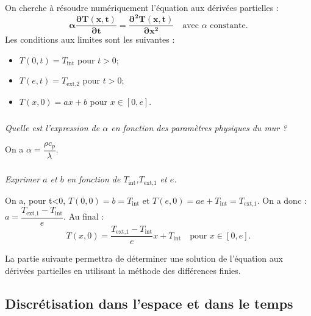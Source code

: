 \documentclass[10pt,fleqn]{article} %
\begin{document}
\ifprof
\else
On cherche à résoudre numériquement l'équation aux dérivées partielles : 
\begin{equation}
\mathbf{\alpha \dfrac{\partial T(x,t)}{\partial t} = \dfrac{\partial^2 T(x,t)}{\partial x^2}} \quad \text{avec }\alpha \text{ constante.}
\end{equation}
Les conditions aux limites sont les suivantes :
\begin{itemize}
\item $T(0,t)=T_{\text{int}}$ pour $t>0$;
\item $T(e,t)=T_{\text{ext,2}}$ pour $t>0$;
\item $T(x,0)=ax + b$ pour $x\in[0,e]$.
\end{itemize}
\fi

\subparagraph{}\textit{Quelle est l'expression de $\alpha$ en fonction des paramètres physiques du mur ?}
\ifprof
\begin{corrige}
On a $\alpha =\dfrac{\rho c_p}{\lambda}$.

\end{corrige}

\else
\fi

\subparagraph{\label{q_tini}}\textit{Exprimer $a$ et $b$ en fonction de $T_{\text{int}}$,$T_{\text{ext,1}}$ et $e$.}
\ifprof
\begin{corrige}
On a, pour t<0, $T(0,0)= b = T_{\text{int}}$ et  $T(e,0)= ae+ T_{\text{int}}= T_{\text{ext,1}}$. On a donc : $a= \dfrac{T_{\text{ext,1}}- T_{\text{int}}}{e}$. Au final :
$$T(x,0)=\dfrac{T_{\text{ext,1}}- T_{\text{int}}}{e} x + T_{\text{int}} \quad \text{pour } x\in[0,e].$$
\end{corrige}
\else
\fi
\ifprof
\else
\vspace{.5cm}

La partie suivante permettra de déterminer une solution de l'équation aux dérivées partielles en utilisant la méthode des différences finies.

\fi
\subsection{Discrétisation dans l'espace et dans le temps}
\ifprof
\else
\end{document}
